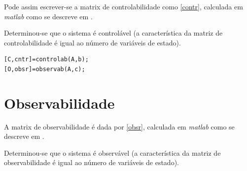 \documentclass[%
  reprint,
  nofootinbib,
  amsmath,amssymb,
  aps,
  10pt,
  a4paper
]{revtex4-1}
\begin{document}

Pode assim escrever-se a matrix de controlabilidade como \eqref{contr}, calculada em {\it matlab} como se descreve em .


Determinou-se que o sistema é controlável (a característica da matriz de controlabilidade é igual ao número de variáveis de estado).

\begin{lstlisting}[label=list1, caption={Código {\it matlab} para o cálculo da matrix de controlabilidade $\mathcal{C}$ e de observabilidade $\mathcal{O}$. As variáveis {\it cntr} e {\it obsr} adquirem valores booleanos, que indicam se o sistema é controlável e/ou observável, respectivamente. As funções {\it controlab} e {\it observab} apresentam-se em anexo em ficheiros com o mesmo nome.}]
[C,cntr]=controlab(A,b);
[O,obsr]=observab(A,c);
\end{lstlisting}


\section{Observabilidade}
A matrix de observabilidade é dada por \eqref{obsr}, calculada em {\it matlab} como se descreve em .


Determinou-se que o sistema é observável (a característica da matriz de observabilidade é igual ao número de variáveis de estado).
\end{document}
